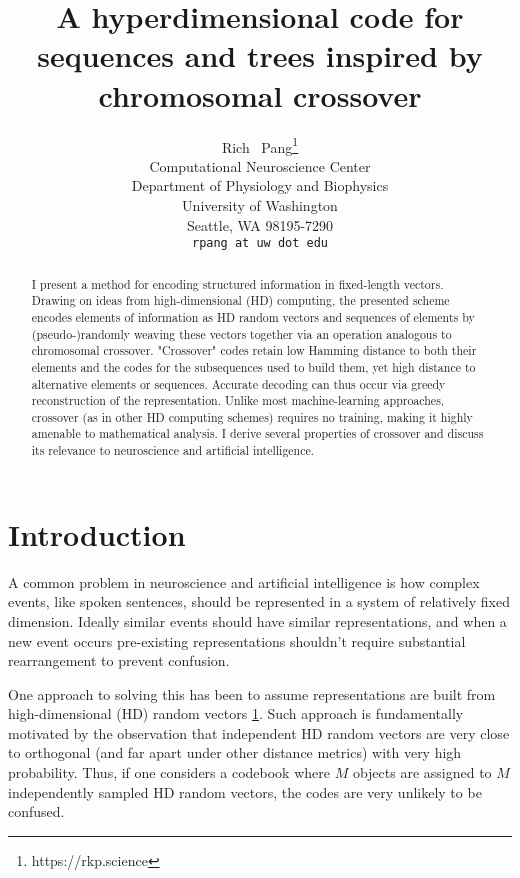 \documentclass{article}
\title{A hyperdimensional code for sequences and trees inspired by chromosomal crossover}
\author{
  Rich ~Pang\thanks{https://rkp.science} \\
  Computational Neuroscience Center\\
  Department of Physiology and Biophysics\\
  University of Washington\\
  Seattle, WA 98195-7290 \\
  \texttt{rpang at uw dot edu} \\
}
\begin{document}
\maketitle

\begin{abstract}
I present a method for encoding structured information in fixed-length vectors. Drawing on ideas from high-dimensional (HD) computing, the presented scheme encodes elements of information as HD random vectors and sequences of elements by (pseudo-)randomly weaving these vectors together via an operation analogous to chromosomal crossover. "Crossover" codes retain low Hamming distance to both their elements and the codes for the subsequences used to build them, yet high distance to alternative elements or sequences. Accurate decoding can thus occur via greedy reconstruction of the representation. Unlike most machine-learning approaches, crossover (as in other HD computing schemes) requires no training, making it highly amenable to mathematical analysis. I derive several properties of crossover and discuss its relevance to neuroscience and artificial intelligence.
\end{abstract}




\section{Introduction}
A common problem in neuroscience and artificial intelligence is how complex events, like spoken sentences, should be represented in a system of relatively fixed dimension. Ideally similar events should have similar representations, and when a new event occurs pre-existing representations shouldn't require substantial rearrangement to prevent confusion.

One approach to solving this has been to assume representations are built from high-dimensional (HD) random vectors \ref{}. Such approach is fundamentally motivated by the observation that independent HD random vectors are very close to orthogonal (and far apart under other distance metrics) with very high probability. Thus, if one considers a codebook where $M$ objects are assigned to $M$ independently sampled HD random vectors, the codes are very unlikely to be confused. 
\end{document}
